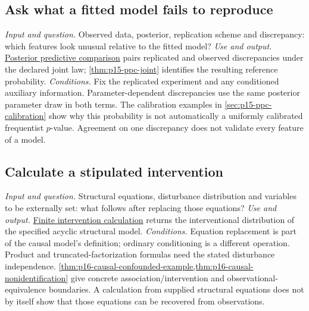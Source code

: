 \subsection{Ask what a fitted model fails to reproduce}
\label{sec:p14-finder-model-criticism}
\textit{Input and question.} Observed data, posterior, replication scheme and
discrepancy: which features look unusual relative to the fitted model?
\textit{Use and output.}
\hyperref[def:p15-ppc-simulation]{Posterior predictive comparison} pairs
replicated and observed discrepancies under the declared joint law;
\cref{thm:p15-ppc-joint} identifies the resulting reference probability.
\textit{Conditions.} Fix the replicated experiment and any conditioned
auxiliary information. Parameter-dependent discrepancies use the same
posterior parameter draw in both terms. The calibration examples in
\cref{sec:p15-ppc-calibration} show why this probability is not automatically
a uniformly calibrated frequentist \(p\)-value. Agreement on one discrepancy
does not validate every feature of a model.

\subsection{Calculate a stipulated intervention}
\label{sec:p14-finder-intervention}
\textit{Input and question.} Structural equations, disturbance distribution
and variables to be externally set: what follows after replacing those
equations?
\textit{Use and output.}
\hyperref[def:p16-causal-finite-calculation]{Finite intervention calculation}
returns the interventional distribution of the specified acyclic structural
model.
\textit{Conditions.} Equation replacement is part of the causal model's
definition; ordinary conditioning is a different operation. Product and
truncated-factorization formulas need the stated disturbance independence.
\cref{thm:p16-causal-confounded-example,thm:p16-causal-nonidentification}
give concrete association/intervention and observational-equivalence
boundaries. A calculation from supplied structural equations does not by itself
show that those equations can be recovered from observations.

